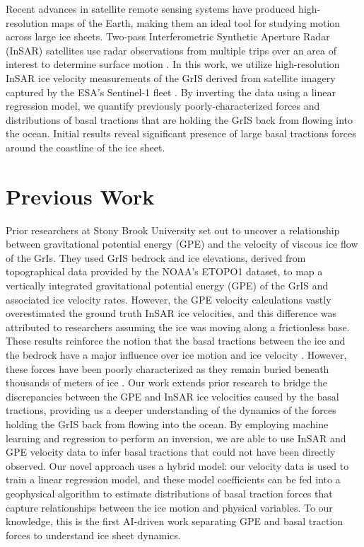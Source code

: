 \documentclass{article}
\begin{document}
Recent advances in satellite remote sensing systems have produced high-resolution maps of the Earth, making them an ideal tool for studying motion across large ice sheets. Two-pass Interferometric Synthetic Aperture Radar (InSAR) satellites use radar observations from multiple trips over an area of interest to determine surface motion \cite{wild_differential_2019}. In this work, we utilize high-resolution InSAR ice velocity measurements of the GrIS derived from satellite imagery captured by the ESA's Sentinel-1 fleet \cite{nagler_sentinel-1_2015}. By inverting the data using a linear regression model, we quantify previously poorly-characterized forces and distributions of basal tractions that are holding the GrIS back from flowing into the ocean. Initial results reveal significant presence of large basal tractions forces around the coastline of the ice sheet.

\section{Previous Work}
Prior researchers at Stony Brook University set out to uncover a relationship between gravitational potential energy (GPE) and the velocity of viscous ice flow of the GrIs. They used GrIS bedrock and ice elevations, derived from topographical data provided by the NOAA's ETOPO1 dataset, to map a vertically integrated gravitational potential energy (GPE) of the GrIS and associated ice velocity rates. However, the GPE velocity calculations vastly overestimated the ground truth InSAR ice velocities, and this difference was attributed to researchers assuming the ice was moving along a frictionless base. These results reinforce the notion that the basal tractions between the ice and the bedrock have a major influence over ice motion and ice velocity \cite{maier_basal_2021}. However, these forces have been poorly characterized as they remain buried beneath thousands of meters of ice \cite{maier_basal_2021}. Our work extends prior research to bridge the discrepancies between the GPE and InSAR ice velocities caused by the basal tractions, providing us a deeper understanding of the dynamics of the forces holding the GrIS back from flowing into the ocean. By employing machine learning and regression to perform an inversion, we are able to use InSAR and GPE velocity data to infer basal tractions that could not have been directly observed. Our novel approach uses a hybrid model: our velocity data is used to train a linear regression model, and these model coefficients can be fed into a geophysical algorithm to estimate distributions of basal traction forces that capture relationships between the ice motion and physical variables. To our knowledge, this is the first AI-driven work separating GPE and basal traction forces to understand ice sheet dynamics.
\end{document}
